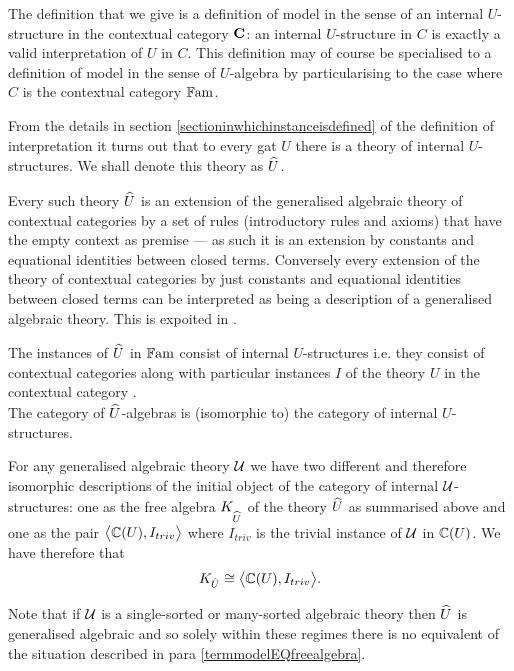 {The definition that we give is a definition  of model in the sense of an internal $U$-structure in the contextual category $\catc$:
an internal $U$-structure in $C$ is exactly 
a valid interpretation of $U$ in $C$. This definition may of course be specialised to a  definition of model in the sense of
$U$-algebra by particularising to the case where $C$ is the contextual category $\Fam$.


From the details in
section \ref{sectioninwhichinstanceisdefined} 
of the definition of interpretation
it turns out that 
to every gat $U$ there is a theory of internal $U$-structures. We shall denote this theory as $\hatU$.

Every such theory $\hatU$ is an extension of the generalised algebraic theory of contextual categories
by a set of rules (introductory rules and axioms) that have  the empty context as premise
 --- as such it is an extension
by constants and equational identities between closed terms.  Conversely every  extension of
the theory of contextual categories by just constants and equational identities between closed terms can be interpreted as being a description of a generalised algebraic theory. This is expoited in \cite{BCDEpaper}.


The instances of $\hatU$  in $\Fam$ consist of  internal $U$-structures  i.e. they consist of contextual categories \catcw along with particular instances $I$ of
the theory $U$ in the contextual category \catc. \\
The category of $\hatU$-algebras is (isomorphic to) the category of internal $U$-structures.


\label{termmodelEQfreealgebra}For any generalised algebraic theory $\gat[U]$ we have two different 
and therefore isomorphic descriptions of the initial object of the category of internal $\gatU$-structures:
one as the free algebra $K_{\hatU}$ of the theory $\hatU$ as summarised above and one  as the pair $\bigtuple{\CofU, I_{triv}}$ 
where $I_{triv}$ is the trivial instance of $\gatU$ in $\CofU$. We have therefore that
\begin{equation}
K_{\hat{U}} \cong \bigtuple{\CofU, I_{triv}}.
\end{equation}


Note that if $\gat[U]$ is a single-sorted or many-sorted algebraic theory then 
$\hatU$ is generalised algebraic 
and so solely within these regimes there is no equivalent of the situation described in para \ref{termmodelEQfreealgebra}.

}
